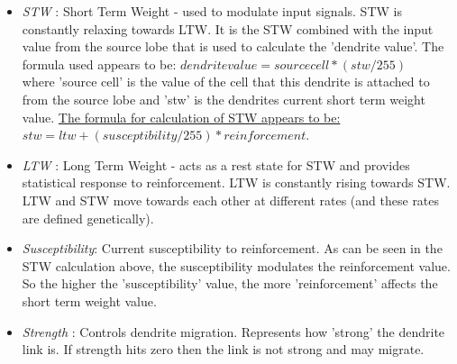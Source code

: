 \documentclass[11pt,twoside,a4paper]{article}
\begin{document}
\begin{itemize}
	\item[] \emph{STW} : Short Term Weight - used to modulate input signals. STW is constantly relaxing towards LTW. It is the STW combined with the input value from the source lobe that is used to calculate the 'dendrite value'. The formula used appears to be: $dendrite value = source cell * ( stw / 255 )$~\\
where 'source cell' is the value of the cell that this dendrite is attached to from the source lobe and 'stw' is the dendrites current short term weight value. \underline{The formula for calculation of STW appears to be: } $stw = ltw + ( susceptibility / 255 ) * reinforcement$. 
	\item[] \emph{LTW} : Long Term Weight - acts as a rest state for STW and provides statistical response to reinforcement. LTW is constantly rising towards STW. LTW and STW move towards each other at different rates (and these rates are defined genetically).
	\item[] \emph{Susceptibility}: Current susceptibility to reinforcement. As can be seen in the STW calculation above, the susceptibility modulates the reinforcement value. So the higher the 'susceptibility' value, the more 'reinforcement' affects the short term weight value. 
	\item[] \emph{Strength} : Controls dendrite migration. Represents how 'strong' the dendrite link is. If strength hits zero then the link is not strong and may migrate.
\end{itemize}~\\
\end{document}
